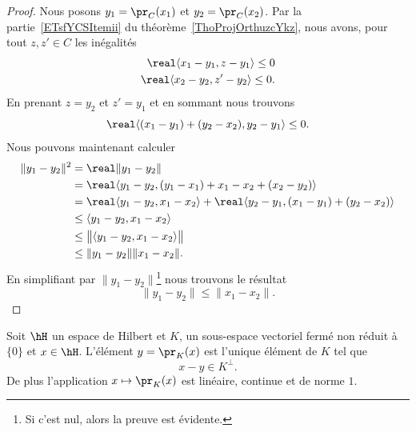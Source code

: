 \begin{proof}
	Nous posons \( y_1=\pr_C(x_1)\) et \( y_2=\pr_C(x_2)\). Par la partie~\ref{ETsfYCSItemii} du théorème~\ref{ThoProjOrthuzcYkz}, nous avons, pour tout \( z,z'\in C\) les inégalités
	\begin{subequations}
		\begin{align}
			\real\langle x_1-y_1, z-y_1\rangle \leq 0 \\
			\real\langle x_2-y_2, z'-y_2\rangle \leq 0.
		\end{align}
	\end{subequations}
	En prenant \( z=y_2\) et \( z'=y_1\) et en sommant nous trouvons
	\begin{equation}
		\real\langle (x_1-y_1)+(y_2-x_2), y_2-y_1\rangle \leq 0.
	\end{equation}
	Nous pouvons maintenant calculer
	\begin{equation}
		\begin{aligned}[]
			\| y_1-y_2 \|^2 & =\real\| y_1-y_2 \|                                                                     \\
			                & =\real\langle y_1-y_2, (y_1-x_1)+x_1-x_2+(x_2-y_2)\rangle                               \\
			                & =\real\langle y_1-y_2, x_1-x_2\rangle +\real\langle y_2-y_1, (x_1-y_1)+(y_2-x_2)\rangle \\
			                & \leq\langle y_1-y_2, x_1-x_2\rangle                                                     \\
			                & \leq\big\| \langle y_1-y_2, x_1-x_2\rangle  \big\|                                      \\
			                & \leq \| y_1-y_2 \|\| x_1-x_2 \|.
		\end{aligned}
	\end{equation}
	En simplifiant par \( \| y_1-y_2 \|\)\footnote{Si c'est nul, alors la preuve est évidente.} nous trouvons le résultat
	\begin{equation}
		\| y_1-y_2 \|\leq \| x_1-x_2 \|.
	\end{equation}
\end{proof}

\begin{theorem}      \label{ThoMXwOjb}
	Soit \( \hH\) un espace de Hilbert et \( K\), un sous-espace vectoriel fermé non réduit à \( \{ 0 \}\) et \( x\in\hH\). L'élément \( y=\pr_K(x)\) est l'unique élément de \( K\) tel que
	\begin{equation}
		x-y\in K^{\perp}.
	\end{equation}
	De plus l'application \( x\mapsto\pr_K(x)\) est linéaire, continue et de norme \( 1\).
\end{theorem}

